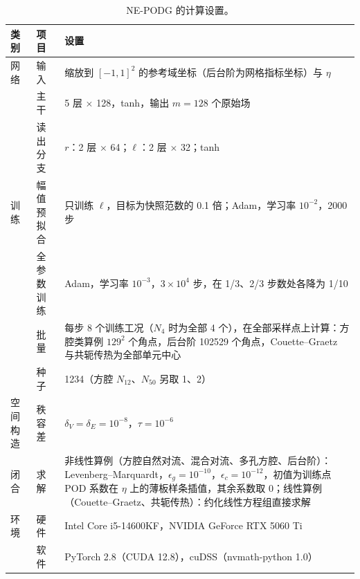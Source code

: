 \begin{table}[H]
\centering
\caption{NE-PODG 的计算设置。}
\label{tab:settings}
\small
\begin{tabular}{llp{}}
\toprule
类别 & 项目 & 设置 \\
\midrule
网络 & 输入 & 缩放到 $[-1,1]^2$ 的参考域坐标（后台阶为网格指标坐标）与 $\eta$ \\
 & 主干 & 5 层 $\times$ 128，tanh，输出 $m=128$ 个原始场 \\
 & 读出分支 & $r$：2 层 $\times$ 64；$\ell$：2 层 $\times$ 32；tanh \\
训练 & 幅值预拟合 & 只训练 $\ell$，目标为快照范数的 0.1 倍；Adam，学习率 $10^{-2}$，2000 步 \\
 & 全参数训练 & Adam，学习率 $10^{-3}$，$3\times10^4$ 步，在 1/3、2/3 步数处各降为 1/10 \\
 & 批量 & 每步 8 个训练工况（$N_4$ 时为全部 4 个），在全部采样点上计算：方腔类算例 $129^2$ 个角点，后台阶 102529 个角点，Couette--Graetz 与共轭传热为全部单元中心 \\
 & 种子 & 1234（方腔 $N_{12}$、$N_{50}$ 另取 1、2） \\
空间构造 & 秩容差 & $\delta_V=\delta_E=10^{-8}$，$\tau=10^{-6}$ \\
闭合 & 求解 & 非线性算例（方腔自然对流、混合对流、多孔方腔、后台阶）：Levenberg--Marquardt，$\epsilon_g=10^{-10}$，$\epsilon_c=10^{-12}$，初值为训练点 POD 系数在 $\eta$ 上的薄板样条插值，其余系数取 0；线性算例（Couette--Graetz、共轭传热）：约化线性方程组直接求解 \\
环境 & 硬件 & Intel Core i5-14600KF，NVIDIA GeForce RTX 5060 Ti \\
 & 软件 & PyTorch 2.8（CUDA 12.8），cuDSS（nvmath-python 1.0） \\
\bottomrule
\end{tabular}
\end{table}
